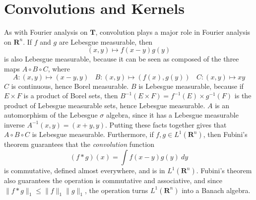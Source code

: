 \section{Convolutions and Kernels}

As with Fourier analysis on $\mathbf{T}$, convolution plays a major role in Fourier analysis on $\mathbf{R}^n$.
%
%
If $f$ and $g$ are Lebesgue measurable, then
%
\[ (x,y) \mapsto f(x - y)g(y) \]
%
is also Lebesgue measurable, because it can be seen as composed of the three maps $A \circ B \circ C$, where
%
\[ A: (x,y) \mapsto (x-y,y)\ \ \ \ B: (x,y) \mapsto (f(x),g(y))\ \ \ \ C: (x,y) \mapsto xy \]
%
$C$ is continuous, hence Borel measurable. $B$ is Lebesgue measurable, because if $E \times F$ is a product of Borel sets, then $B^{-1}(E \times F) = f^{-1}(E) \times g^{-1}(F)$ is the product of Lebesgue measurable sets, hence Lebesgue measurable. $A$ is an automorphism of the Lebesgue $\sigma$ algebra, since it has a Lebesgue measurable inverse $A^{-1}(x,y) = (x+y,y)$. Putting these facts together gives that $A \circ B \circ C$ is Lebesgue measurable. Furthermore, if $f,g \in L^1(\mathbf{R}^n)$, then Fubini's theorem guarantees that the {\it convolution} function
%
\[ (f * g)(x) = \int f(x-y)g(y)\ dy \]
%
is commutative, defined almost everywhere, and is in $L^1(\mathbf{R}^n)$. Fubini's theorem also guarantees the operation is commutative and associative, and since $\| f * g \|_1 \leq \| f \|_1 \| g \|_1$, the operation turns $L^1(\mathbf{R}^n)$ into a Banach algebra.

%
%

